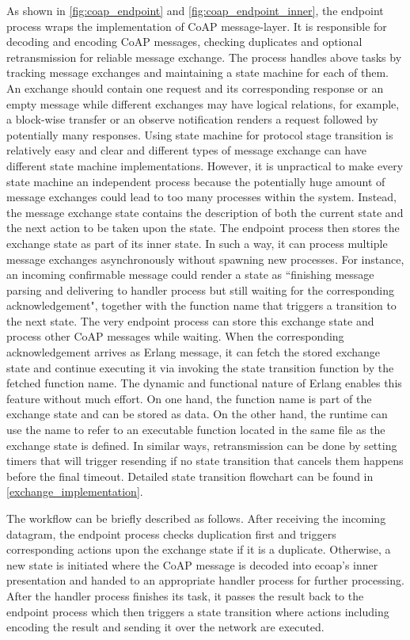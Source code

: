 As shown in \autoref{fig:coap_endpoint} and \autoref{fig:coap_endpoint_inner}, the endpoint process wraps the implementation of CoAP message-layer. It is responsible for decoding and encoding CoAP messages, checking duplicates and optional retransmission for reliable message exchange. The process handles above tasks by tracking message exchanges and maintaining a state machine for each of them. An exchange should contain one request and its corresponding response or an empty message while different exchanges may have logical relations, for example, a block-wise transfer or an observe notification renders a request followed by potentially many responses. Using state machine for protocol stage transition is relatively easy and clear and different types of message exchange can have different state machine implementations. However, it is unpractical to make every state machine an independent process because the potentially huge amount of message exchanges could lead to too many processes within the system. Instead, the message exchange state contains the description of both the current state and the next action to be taken upon the state. The endpoint process then stores the exchange state as part of its inner state. In such a way, it can process multiple message exchanges asynchronously without spawning new processes. For instance, an incoming confirmable message could render a state as ``finishing message parsing and delivering to handler process but still waiting for the corresponding acknowledgement", together with the function name that triggers a transition to the next state. The very endpoint process can store this exchange state and process other CoAP messages while waiting. When the corresponding acknowledgement arrives as Erlang message, it can fetch the stored exchange state and continue executing it via invoking the state transition function by the fetched function name. The dynamic and functional nature of Erlang enables this feature without much effort. On one hand, the function name is part of the exchange state and can be stored as data. On the other hand, the runtime can use the name to refer to an executable function located in the same file as the exchange state is defined. In similar ways, retransmission can be done by setting timers that will trigger resending if no state transition that cancels them happens before the final timeout. Detailed state transition flowchart can be found in \autoref{exchange_implementation}.

The workflow can be briefly described as follows. After receiving the incoming datagram, the endpoint process checks duplication first and triggers corresponding actions upon the exchange state if it is a duplicate. Otherwise, a new state is initiated where the CoAP message is decoded into ecoap's inner presentation and handed to an appropriate handler process for further processing. After the handler process finishes its task, it passes the result back to the endpoint process which then  triggers a state transition where actions including encoding the result and sending it over the network are executed.

